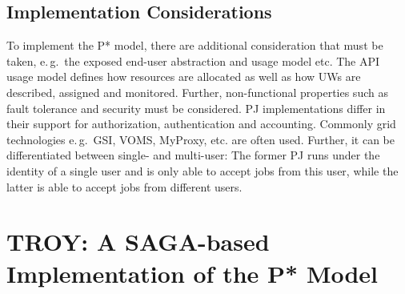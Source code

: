 \documentclass[conference,final]{IEEEtran}
\newcommand{\jhanote}[1]{ {\textcolor{red} { ***shantenu: #1 }}}
\newcommand{\msnote}[1]{ {\textcolor{cyan} { ***mark: #1 }}}
\newcommand{\jhanote}[1]{}
\newcommand{\msnote}[1]{}
\newcommand{\upp}{\vspace*{-0.5em}}
\begin{document}
\subsection{Implementation Considerations\upp\upp}




To implement the P* model, there are additional consideration that must be
taken, e.\,g.\ the exposed end-user abstraction and usage model etc. The API
usage model defines how resources are allocated as well as how UWs are
described, assigned and monitored. Further, non-functional properties such as
fault tolerance and security must be considered. PJ implementations differ in
their support for authorization, authentication and accounting. Commonly grid
technologies e.\,g.\ GSI, VOMS, MyProxy, etc. are often used. Further, it can be
differentiated between single- and multi-user: The former PJ runs under the
identity of a single user and is only able to accept jobs from this user, while
the latter is able to accept jobs from different users.



\section{TROY: A SAGA-based Implementation of the P* Model\upp\upp}


\end{document}
